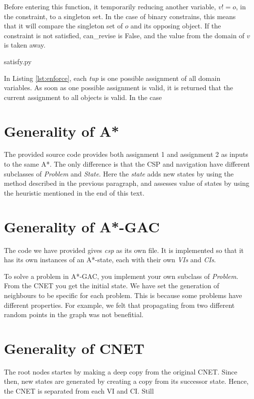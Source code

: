 \documentclass[journal]{IEEEtran}
\begin{document}
Before entering this function, it 
temporarily reducing another variable, $v != o$, in the constraint,
to a singleton set. In the case of binary constrains, this means
that it will compare the singleton set of $o$ and its opposing object.
If the constraint is not satisfied, can\_revise is False, and the value
from the domain of $v$ is taken away.

\begin{lstinputlisting}[caption="Checking constraint",language=Python]{satisfy.py}
    \label{lst:enforce}
\end{lstinputlisting}

In Listing \autoref{lst:enforce}, each \textit{tup} is one possible assignment
of all domain variables. As soon as one possible assignment is valid,
it is returned that the current assignment to all objects is valid.
In the case 

\section{Generality of A*}
The provided source code provides both assignment 1 and assignment 2
as inputs to the same A*. The only difference is that the CSP and navigation
have different subclasses of \textit{Problem} and \textit{State}. Here the \textit{state} adds
new states by using the method described in the previous paragraph, and assesses
value of states by using the heuristic mentioned in the end of this text.

\section{Generality of A*-GAC}
The code we have provided gives \textit{csp} as its own file. 
It is implemented so that it has its own instances of an 
A*-state, each with their own \textit{VIs} and \textit{CIs}.

To solve a problem in A*-GAC, you implement your own subclass of 
\textit{Problem}. From the CNET you get the initial state. We have set
the generation of neighbours to be specific for each problem. This is because
some problems have different properties. For example, we felt that
propagating from two different random points in the graph was not benefitial.

\section{Generality of CNET}
The root nodes startes by making a deep copy from the original CNET.
Since then, new states are generated by creating a copy from its successor state.
Hence, the CNET is separated from each VI and CI. Still 
\end{document}
